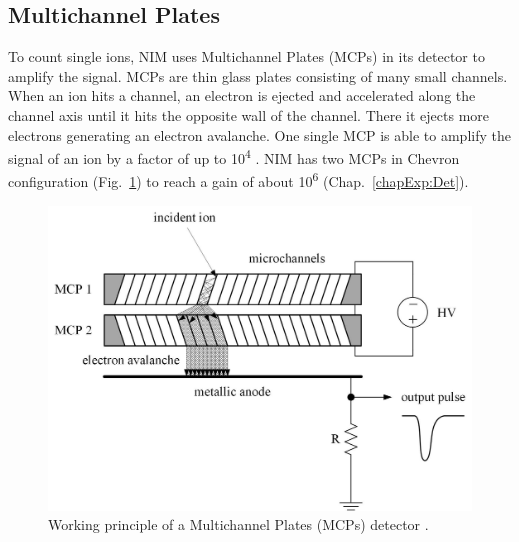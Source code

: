 	\subsection{Multichannel Plates}\label{sec:DetParam}
	To count single ions, NIM uses Multichannel Plates (MCPs) in its detector to amplify the signal. MCPs are thin glass plates consisting of many small channels. When an ion hits a channel, an electron is ejected and accelerated along the channel axis until it hits the opposite wall of the channel. There it ejects more electrons generating an electron avalanche. One single MCP is able to amplify the signal of an ion by a factor of up to 10\textsuperscript{4} \cite{Wiza_1979_MCP}. NIM has two MCPs in Chevron configuration (Fig.~\ref{fig:MCPPrincipleSchema}) to reach a gain of about 10\textsuperscript{6} (Chap.~\ref{chapExp:Det}).
	\begin{figure}[h]
		\centering
		\includegraphics[width=.7\textwidth]{Bilder/MCP_PrinipleSchema.jpg}
		\caption{Working principle of a Multichannel Plates (MCPs) detector \cite{Wiza_1979_MCP,Diss_Meyer}.}
		\label{fig:MCPPrincipleSchema}
	\end{figure}
	
